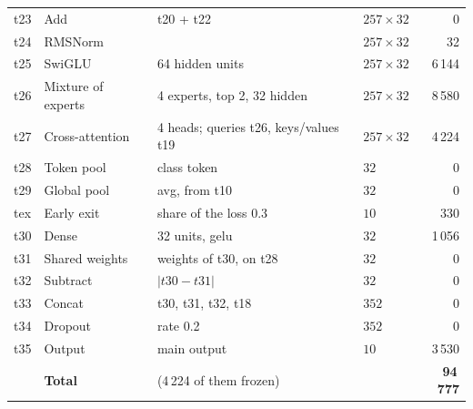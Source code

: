 {\begin{longtable}{@{}lp{3.2cm}p{5.4cm}lr@{}}
t23 & Add & t20 + t22 & $257\times32$ & 0\\
t24 & RMSNorm &  & $257\times32$ & 32\\
t25 & SwiGLU & 64 hidden units & $257\times32$ & 6\,144\\
t26 & Mixture of experts & 4 experts, top 2, 32 hidden & $257\times32$ & 8\,580\\
t27 & Cross-attention & 4 heads; queries t26, keys/values t19 & $257\times32$ & 4\,224\\
t28 & Token pool & class token & $32$ & 0\\
t29 & Global pool & avg, from t10 & $32$ & 0\\
tex & Early exit & share of the loss 0.3 & $10$ & 330\\
t30 & Dense & 32 units, gelu & $32$ & 1\,056\\
t31 & Shared weights & weights of t30, on t28 & $32$ & 0\\
t32 & Subtract & $|t30 - t31|$ & $32$ & 0\\
t33 & Concat & t30, t31, t32, t18 & $352$ & 0\\
t34 & Dropout & rate 0.2 & $352$ & 0\\
t35 & Output & main output & $10$ & 3\,530\\
\midrule
 & \textbf{Total} & (4\,224 of them frozen) & & \textbf{94\,777}\\
\bottomrule
\end{longtable}}
